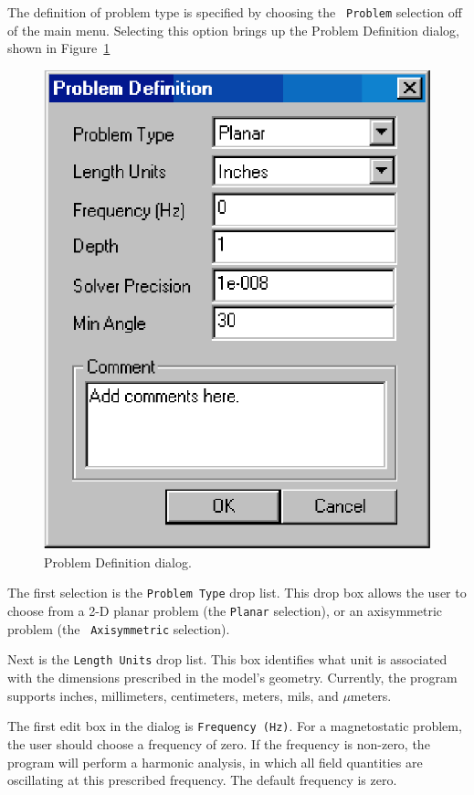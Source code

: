 \documentclass[12pt]{report}
\begin{document}
The definition of problem type is specified by choosing the {\tt
Problem} selection off of the main menu.  Selecting this option
brings up the Problem Definition dialog, shown in
Figure~\ref{problemdefinition}
\begin{figure}[ht]
\centerline{\includegraphics{probdef.ps}}
\caption{Problem Definition dialog.}
\label{problemdefinition}
\end{figure}

The first selection is the {\tt Problem Type} drop list.  This
drop box allows the user to choose from a 2-D planar problem (the
{\tt Planar} selection), or an axisymmetric problem (the {\tt
Axisymmetric} selection).

Next is the {\tt Length Units} drop list.  This box identifies what
unit is associated with the dimensions prescribed in the model's
geometry.  Currently, the program supports inches, millimeters,
centimeters, meters, mils, and $\mu$meters.

The first edit box in the dialog is {\tt Frequency (Hz)}.  For a
magnetostatic problem, the user should choose a frequency of zero.
If the frequency is non-zero, the program will perform a harmonic
analysis, in which all field quantities are oscillating at this
prescribed frequency.  The default frequency is zero.
\end{document}
